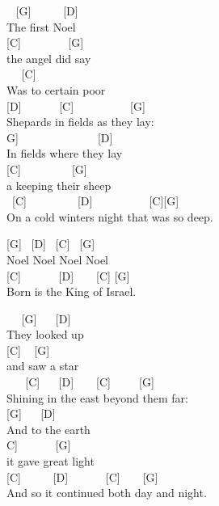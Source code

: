 \documentclass[
  letterpaper,
  twoside=false]{scrbook}
\begin{document}
~ {[}G{]} ~ ~ ~ {[}D{]}\\
The first Noel\\
\hspace*{0.333em} {[}C{]} ~ ~ ~ ~ ~{[}G{]}\\
the angel did say\\
\hspace*{0.333em} ~ ~{[}C{]}\\
Was to certain poor\\
{[}D{]} ~ ~ ~ ~{[}C{]} ~ ~ ~ ~ ~ ~{[}G{]}\\
Shepards in fields as they lay:\\
\hspace*{0.333em}{[}G{]} ~ ~ ~ ~ ~ ~ ~ ~ {[}D{]}\\
In fields where they lay\\
{[}C{]} ~ ~ ~ ~ ~ {[}G{]}\\
a keeping their sheep\\
\hspace*{0.333em} ~{[}C{]} ~ ~ ~ ~ ~ {[}D{]} ~ ~ ~ ~ ~ ~{[}C{]}{[}G{]}\\
On a cold winter\textquotesingle s night that was so deep.

{[}G{]} ~{[}D{]} ~{[}C{]} ~{[}G{]}\\
Noel Noel Noel Noel\\
{[}C{]} ~ ~ ~ ~{[}D{]} ~ ~ {[}C{]} {[}G{]}\\
Born is the King of Israel.

~ ~{[}G{]} ~ ~{[}D{]} ~\\
They looked up\\
\hspace*{0.333em} {[}C{]} ~ {[}G{]}\\
and saw a star\\
\hspace*{0.333em} ~ ~ {[}C{]} ~ ~{[}D{]} ~ ~ {[}C{]} ~ ~ ~{[}G{]}\\
Shining in the east beyond them far:\\
\hspace*{0.333em} {[}G{]} ~ ~{[}D{]} ~ ~ ~\\
And to the earth\\
\hspace*{0.333em}{[}C{]} ~ ~ ~ ~{[}G{]}\\
it gave great light\\
\hspace*{0.333em} {[}C{]} ~ ~ ~ {[}D{]} ~ ~ ~ ~{[}C{]} ~ ~ {[}G{]}\\
And so it continued both day and night.
\end{document}
